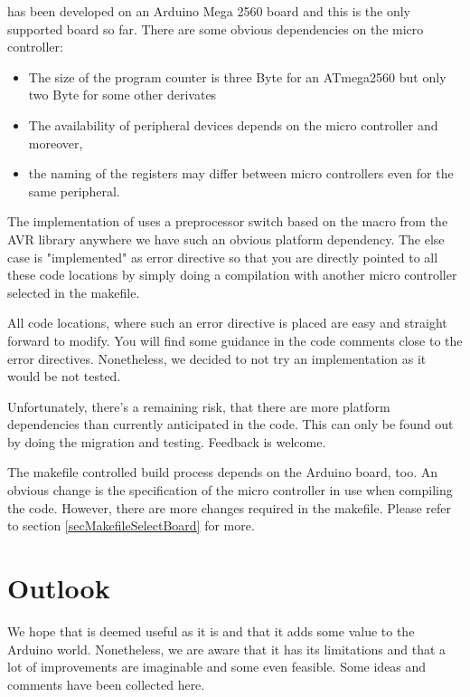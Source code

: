 \rtos{} has been developed on an Arduino Mega 2560 board and this is the
only supported board so far. There are some obvious dependencies on the
micro controller:
\begin{itemize}
  \item The size of the program counter is three Byte for an ATmega2560
    but only two Byte for some other derivates
  \item The availability of peripheral devices depends on the micro controller and
    moreover,
  \item the naming of the registers may differ between micro controllers even for the
    same peripheral.
\end{itemize}
The implementation of \rtos{} uses a preprocessor switch based on the
macro  from the AVR library anywhere we have
such an obvious platform dependency. The else case is "implemented" as
error directive so that you are directly pointed to all these code locations
by simply doing a compilation with another micro controller selected in the makefile.

All code locations, where such an error directive is placed are easy and
straight forward to modify. You will find some guidance in the code
comments close to the error directives. Nonetheless, we decided to not try
an implementation as it would be not tested.

Unfortunately, there's a remaining risk, that there are more platform
dependencies than currently anticipated in the code. This can only be
found out by doing the migration and testing. Feedback is welcome.

The makefile controlled build process depends on the Arduino board, too.
An obvious change is the specification of the micro controller in use when compiling
the code. However, there are more changes required in the makefile. Please
refer to section \ref{secMakefileSelectBoard} for more.


\chapter{Outlook}
\label{secOutlook}

We hope that \rtos{} is deemed useful as it is and that it adds some value
to the Arduino world. Nonetheless, we are aware that it has its limitations
and that a lot of improvements are imaginable and some even feasible. Some
ideas and comments have been collected here.

